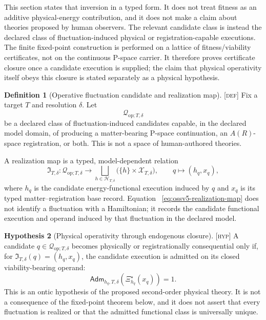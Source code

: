\documentclass[11pt]{article}
\newcommand{\Defn}{\textsc{[def]}}
\newcommand{\Hyp}{\textsc{[hyp]}}
\theoremstyle{definition}
\newtheorem{definition}{Definition}[section]
\newtheorem{hypothesis}[definition]{Hypothesis}
\begin{document}
This section states that inversion in a typed form.  It does not treat fitness
as an additive physical-energy contribution, and it does not make a claim about
theories proposed by human observers.  The relevant candidate class is instead
the declared class of fluctuation-induced physical or registration-capable
executions.  The finite fixed-point construction is performed on a lattice of
fitness/viability certificates, not on the continuous P-space carrier.  It therefore
proves certificate closure once a candidate execution is supplied; the claim
that physical operativity itself obeys this closure is stated separately as a
physical hypothesis.

\begin{definition}[Operative fluctuation candidate and realization map]
\label{def:ossv5-operative-candidate}
\Defn{} Fix a target $T$ and resolution $\delta$.  Let
\begin{equation}
\mathcal Q_{\mathrm{op};T,\delta}
\label{eq:ossv5-qop}
\end{equation}
be a declared class of fluctuation-induced candidates capable, in the declared
model domain, of producing a matter-bearing P-space continuation, an $A(R)$-space
registration, or both.  This is not a space of human-authored theories.

A realization map is a typed, model-dependent relation
\begin{equation}
\mathfrak I_{T,\delta}:
\mathcal Q_{\mathrm{op};T,\delta}
\longrightarrow
\bigsqcup_{h\in\mathcal H_{T,\delta}}
\bigl(\{h\}\times\mathcal X_{T,\delta}\bigr),
\qquad
q\longmapsto(h_q,x_q),
\label{eq:ossv5-realization-map}
\end{equation}
where $h_q$ is the candidate energy-functional execution induced by $q$ and
$x_q$ is its typed matter--registration base record.  Equation~
\eqref{eq:ossv5-realization-map} does not identify a fluctuation with a
Hamiltonian; it records the candidate functional execution and operand induced
by that fluctuation in the declared model.
\end{definition}

\begin{hypothesis}[Physical operativity through endogenous closure]
\label{hyp:ossv5-physical-operativity}
\Hyp{} A candidate $q\in\mathcal Q_{\mathrm{op};T,\delta}$ becomes physically
or registrationally consequential only if, for
$\mathfrak I_{T,\delta}(q)=(h_q,x_q)$, the candidate execution is admitted on
its closed viability-bearing operand:
\begin{equation}
\mathsf{Adm}_{h_q,T,\delta}\!\left(\Xi_{h_q}^{\star}(x_q)\right)=1.
\label{eq:ossv5-operativity-condition}
\end{equation}
This is an ontic hypothesis of the proposed second-order physical theory.  It
is not a consequence of the fixed-point theorem below, and it does not assert
that every fluctuation is realized or that the admitted functional class is
universally unique.
\end{hypothesis}
\end{document}
